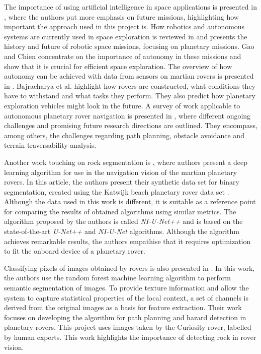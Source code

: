 \documentclass[a4paper,twoside,12pt]{book}
\begin{document}
The importance of using artificial intelligence in space applications is presented in \cite{chien2006future}, where the authors put more emphasis on future missions, highlighting how important the approach used in this project is. How robotics and autonomous systems are currently used in space exploration is reviewed in \cite{gao2017review} and presents the history and future of robotic space missions, focusing on planetary missions. Gao and Chien concentrate on the importance of autonomy in these missions and show that it is crucial for efficient space exploration. The overview of how autonomy can be achieved with data from sensors on martian rovers is presented in \cite{bajracharya2008autonomy}. Bajracharya et al. highlight how rovers are constructed, what conditions they have to withstand and what tasks they perform. They also predict how planetary exploration vehicles might look in the future.
 A survey of work applicable to autonomous planetary rover navigation is presented in \cite{wong2017adaptive}, where different ongoing challenges and promising future research directions are outlined. They encompass, among others, the challenges regarding path planning, obstacle avoidance and terrain traversability analysis.

Another work touching on rock segmentation is \cite{kuang2021rock}, where authors present a deep learning algorithm for use in the navigation vision of the martian planetary rovers. In this article, the authors present their synthetic data set for binary segmentation, created using the Katwijk beach planetary rover data set \cite{hewitt2018katwijk}. Although the data used in this work is different, it is suitable as a reference point for comparing the results of obtained algorithms using similar metrics. The algorithm proposed by the authors is called \emph{NI-U-Net++} and is based on the state-of-the-art \emph{U-Net++} and \emph{NI-U-Net} algorithms. Although the algorithm achieves remarkable results, the authors empathise that it requires optimization to fit the onboard device of a planetary rover.

Classifying pixels of images obtained by rovers is also presented in \cite{ono2015risk}. In this work, the authors use the random forest machine learning algorithm to perform semantic segmentation of images. To provide texture information and allow the system to capture statistical properties of the local context, a set of channels is derived from the original images as a basis for feature extraction. Their work focuses on developing the algorithm for path planning and hazard detection in planetary rovers. This project uses images taken by the Curiosity rover, labelled by human experts. This work highlights the importance of detecting rock in rover vision.
\end{document}
